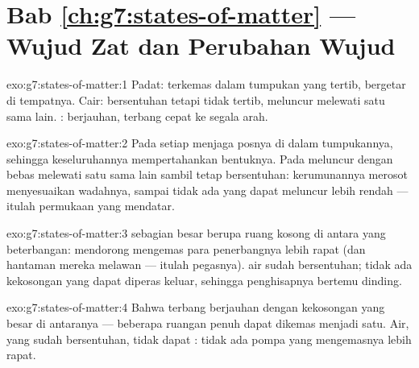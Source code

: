 \section*{Bab \ref{ch:g7:states-of-matter} --- Wujud Zat dan Perubahan Wujud}

\begin{solution}{exo:g7:states-of-matter:1}
Padat:  terkemas dalam tumpukan yang tertib, bergetar di
tempatnya. Cair:  bersentuhan tetapi tidak tertib, meluncur
melewati satu sama lain. :  berjauhan, terbang cepat ke
segala arah.
\end{solution}

\begin{solution}{exo:g7:states-of-matter:2}
Pada  setiap  menjaga posnya di dalam tumpukannya,
sehingga keseluruhannya mempertahankan bentuknya. Pada 
 meluncur dengan bebas melewati satu sama lain sambil tetap
bersentuhan: kerumunannya merosot menyesuaikan wadahnya, sampai tidak
ada yang dapat meluncur lebih rendah --- itulah permukaan yang
mendatar.
\end{solution}

\begin{solution}{exo:g7:states-of-matter:3}
 sebagian besar berupa ruang kosong di antara  yang
beterbangan: mendorong mengemas para penerbangnya lebih rapat (dan
hantaman mereka melawan --- itulah pegasnya).  air sudah
bersentuhan; tidak ada kekosongan yang dapat diperas keluar, sehingga
penghisapnya bertemu dinding.
\end{solution}

\begin{solution}{exo:g7:states-of-matter:4}
Bahwa   terbang berjauhan dengan kekosongan yang besar di
antaranya --- beberapa ruangan penuh dapat dikemas menjadi satu. Air,
yang  sudah bersentuhan, tidak dapat : tidak ada
pompa yang mengemasnya lebih rapat.
\end{solution}

